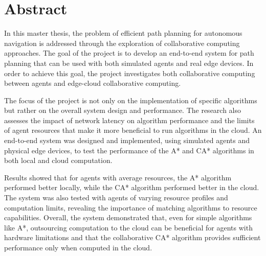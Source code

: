 \chapter{Abstract}
In this master thesis, the problem of efficient path planning for autonomous navigation is addressed through the exploration of collaborative computing approaches. The goal of the project is to develop an end-to-end system for path planning that can be used with both simulated agents and real edge devices. In order to achieve this goal, the project investigates both collaborative computing between agents and edge-cloud collaborative computing. 

The focus of the project is not only on the implementation of specific algorithms but rather on the overall system design and performance. The research also assesses the impact of network latency on algorithm performance and the limits of agent resources that make it more beneficial to run algorithms in the cloud. An end-to-end system was designed and implemented, using simulated agents and physical edge devices, to test the performance of the A* and CA* algorithms in both local and cloud computation.

Results showed that for agents with average resources, the A* algorithm performed better locally, while the CA* algorithm performed better in the cloud. The system was also tested with agents of varying resource profiles and computation limits, revealing the importance of matching algorithms to resource capabilities. Overall, the system demonstrated that, even for simple algorithms like A*, outsourcing computation to the cloud can be beneficial for agents with hardware limitations and that the collaborative CA* algorithm provides sufficient performance only when computed in the cloud.


